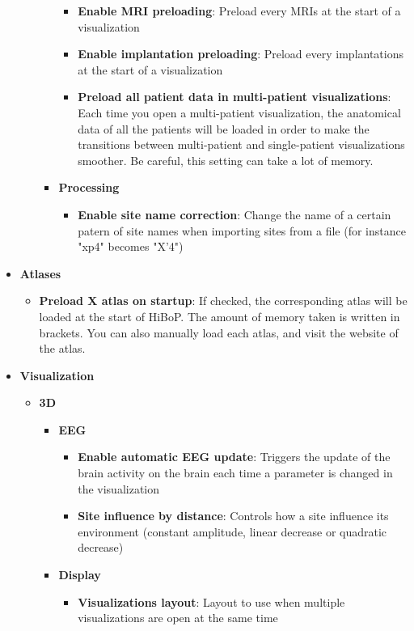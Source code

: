 \documentclass[a4paper]{article}
\begin{document}
\begin{itemize}
\begin{itemize}
\begin{itemize}
\begin{itemize}
\item \textbf{Enable MRI preloading}: Preload every MRIs at the start of a visualization
\item \textbf{Enable implantation preloading}: Preload every implantations at the start of a visualization
\item \textbf{Preload all patient data in multi-patient visualizations}: Each time you open a multi-patient visualization, the anatomical data of all the patients will be loaded in order to make the transitions between multi-patient and single-patient visualizations smoother. Be careful, this setting can take a lot of memory.
\end{itemize}
\item \textbf{Processing}
\begin{itemize}
\item \textbf{Enable site name correction}: Change the name of a certain patern of site names when importing sites from a file (for instance "xp4" becomes "X'4")
\end{itemize}
\end{itemize}
\end{itemize}
\item \textbf{Atlases}
\begin{itemize}
\item \textbf{Preload X atlas on startup}: If checked, the corresponding atlas will be loaded at the start of HiBoP. The amount of memory taken is written in brackets. You can also manually load each atlas, and visit the website of the atlas.
\end{itemize}
\item \textbf{Visualization}
\begin{itemize}
\item \textbf{3D}
\begin{itemize}
\item \textbf{EEG}
\begin{itemize}
\item \textbf{Enable automatic EEG update}: Triggers the update of the brain activity on the brain each time a parameter is changed in the visualization
\item \textbf{Site influence by distance}: Controls how a site influence its environment (constant amplitude, linear decrease or quadratic decrease)
\end{itemize}
\item \textbf{Display}
\begin{itemize}
\item \textbf{Visualizations layout}: Layout to use when multiple visualizations are open at the same time

\end{itemize}
\end{itemize}
\end{itemize}
\end{itemize}
\end{document}
